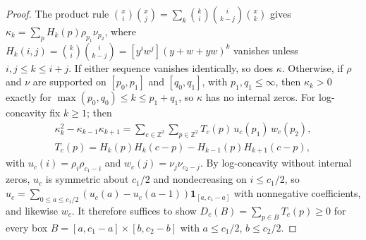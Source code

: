 \begin{proof}
The product rule $\binom xi\binom xj=\sum_k\binom ki\binom i{k-j}\binom xk$ gives $\kappa_k=\sum_pH_k(p)\rho_{p_1}\nu_{p_2}$, where $H_k(i,j)=\binom ki\binom i{k-j}=[y^iw^j](y+w+yw)^k$ vanishes unless $i,j\leq k\leq i+j$. If either sequence vanishes identically, so does $\kappa$. Otherwise, if $\rho$ and $\nu$ are supported on $[p_0,p_1]$ and $[q_0,q_1]$, with $p_1,q_1\leq\infty$, then $\kappa_k>0$ exactly for $\max(p_0,q_0)\leq k\leq p_1+q_1$, so $\kappa$ has no internal zeros. For log-concavity fix $k\geq1$; then
\[
\begin{gathered}
\kappa_k^2-\kappa_{k-1}\kappa_{k+1}=\sum_{c\in\mathbb Z^2}\sum_{p\in\mathbb Z^2}T_c(p)\,u_c(p_1)\,w_c(p_2),\\
T_c(p)=H_k(p)H_k(c-p)-H_{k-1}(p)H_{k+1}(c-p),
\end{gathered}
\]
with $u_c(i)=\rho_i\rho_{c_1-i}$ and $w_c(j)=\nu_j\nu_{c_2-j}$. By log-concavity without internal zeros, $u_c$ is symmetric about $c_1/2$ and nondecreasing on $i\leq c_1/2$, so $u_c=\sum_{0\leq a\leq c_1/2}(u_c(a)-u_c(a-1))\mathbf 1_{[a,c_1-a]}$ with nonnegative coefficients, and likewise $w_c$. It therefore suffices to show $D_c(B)=\sum_{p\in B}T_c(p)\geq0$ for every box $B=[a,c_1-a]\times[b,c_2-b]$ with $a\leq c_1/2$, $b\leq c_2/2$.


\end{proof}
